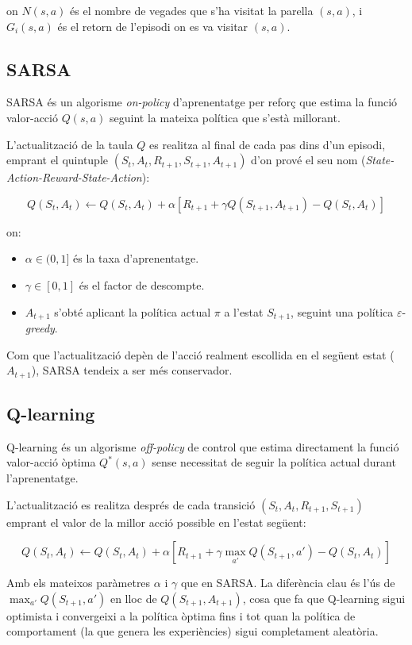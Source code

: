 \documentclass[12pt,a4paper]{report}
\begin{document}
on $N(s,a)$ és el nombre de vegades que s'ha visitat la parella $(s,a)$, i $G_i(s,a)$ és el retorn de
l'episodi on es va visitar $(s,a)$.

\newpage
\subsection{SARSA}

SARSA és un algorisme \textit{on-policy} d'aprenentatge per reforç que estima la funció valor-acció $Q(s,a)$
seguint la mateixa política que s'està millorant.

L'actualització de la taula $Q$ es realitza al final de cada pas dins d'un episodi,
emprant el quintuple $(S_t, A_t, R_{t+1}, S_{t+1}, A_{t+1})$ d'on prové el seu nom
(\textit{State-Action-Reward-State-Action}):

\[
  Q(S_t, A_t) \gets Q(S_t, A_t) + \alpha \left[ R_{t+1} + \gamma Q(S_{t+1}, A_{t+1}) - Q(S_t, A_t) \right]
\]

on:
\begin{itemize}
  \item $\alpha \in (0,1]$ és la taxa d'aprenentatge.
  \item $\gamma \in [0,1]$ és el factor de descompte.
  \item $A_{t+1}$ s'obté aplicant la política actual $\pi$ a l'estat $S_{t+1}$, seguint una política
    $\varepsilon$-\textit{greedy}.
\end{itemize}

Com que l'actualització depèn de l'acció realment escollida en el següent estat ($A_{t+1}$),
SARSA tendeix a ser més conservador.

\subsection{Q-learning}
Q-learning és un algorisme \textit{off-policy} de control que estima directament la funció valor-acció òptima
$Q^*(s,a)$ sense necessitat de seguir la política actual durant l'aprenentatge.

L'actualització es realitza després de cada transició $(S_t, A_t, R_{t+1}, S_{t+1})$ emprant el valor de la
millor acció possible en l'estat següent:

\[
Q(S_t, A_t) \gets Q(S_t, A_t) + \alpha \left[ R_{t+1} + \gamma \max_{a'} Q(S_{t+1}, a') - Q(S_t, A_t) \right]
\]

Amb els mateixos paràmetres $\alpha$ i $\gamma$ que en SARSA.
La diferència clau és l'ús de $\max_{a'} Q(S_{t+1}, a')$ en lloc de $Q(S_{t+1}, A_{t+1})$, cosa que fa que
Q-learning sigui optimista i convergeixi a la política òptima fins i tot quan la política de comportament
(la que genera les experiències) sigui completament aleatòria.
\end{document}
